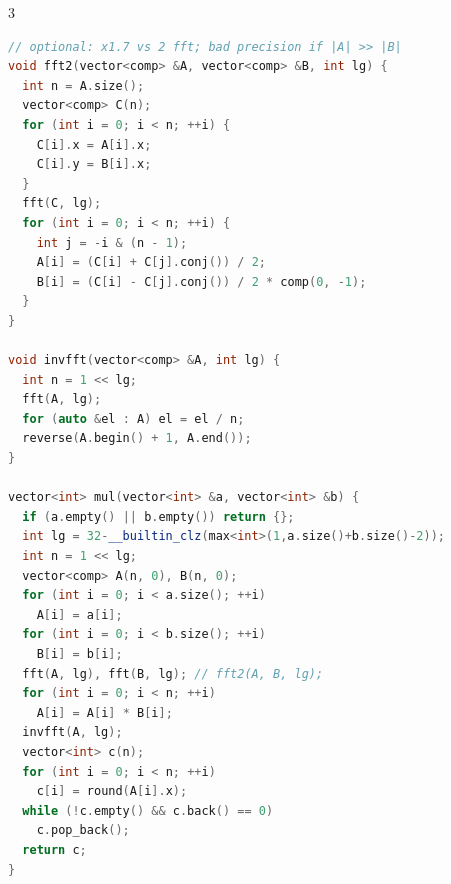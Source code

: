 \documentclass[8pt,a4paper,landscape,twosided]{extarticle}
\begin{document}
\begin{multicols*}{3}
\begin{lstlisting}[language=C++]
// optional: x1.7 vs 2 fft; bad precision if |A| >> |B|
void fft2(vector<comp> &A, vector<comp> &B, int lg) {
  int n = A.size();
  vector<comp> C(n);
  for (int i = 0; i < n; ++i) {
    C[i].x = A[i].x;
    C[i].y = B[i].x;
  }
  fft(C, lg);
  for (int i = 0; i < n; ++i) {
    int j = -i & (n - 1);
    A[i] = (C[i] + C[j].conj()) / 2;
    B[i] = (C[i] - C[j].conj()) / 2 * comp(0, -1);
  }
}

void invfft(vector<comp> &A, int lg) {
  int n = 1 << lg;
  fft(A, lg);
  for (auto &el : A) el = el / n;
  reverse(A.begin() + 1, A.end());
}

vector<int> mul(vector<int> &a, vector<int> &b) {
  if (a.empty() || b.empty()) return {};
  int lg = 32-__builtin_clz(max<int>(1,a.size()+b.size()-2));
  int n = 1 << lg;
  vector<comp> A(n, 0), B(n, 0);
  for (int i = 0; i < a.size(); ++i)
    A[i] = a[i];
  for (int i = 0; i < b.size(); ++i)
    B[i] = b[i];
  fft(A, lg), fft(B, lg); // fft2(A, B, lg);
  for (int i = 0; i < n; ++i)
    A[i] = A[i] * B[i];
  invfft(A, lg);
  vector<int> c(n);
  for (int i = 0; i < n; ++i)
    c[i] = round(A[i].x);
  while (!c.empty() && c.back() == 0)
    c.pop_back();
  return c;
}
\end{lstlisting}


\end{multicols*}
\end{document}
